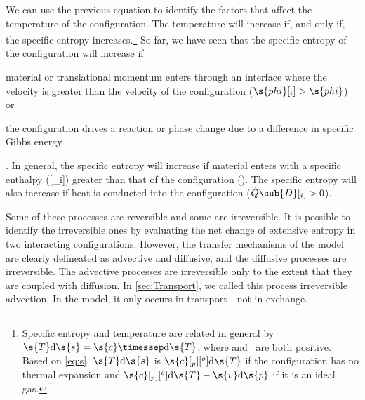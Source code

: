 We can use the previous equation to identify the factors that affect the temperature of the configuration.  The temperature will increase if, and only if, the specific entropy increases.\footnote{Specific entropy and temperature are related in general by $\s{T}\mathrm{d}\s{s} = \s{c}\timessep\mathrm{d}\s{T}$, where  and~ are both positive.  Based on \autoref{eq:s}, $\s{T}\mathrm{d}\s{s}$ is $\s{c}[_p][^o]\mathrm{d}\s{T}$ if the configuration has no thermal expansion and $\s{c}[_p][^o]\mathrm{d}\s{T} - \s{v}\mathrm{d}\s{p}$ if it is an ideal gas.}  So far, we have seen that the specific entropy of the configuration will increase if \begin{inparaenum}[(1)]\item material or translational momentum enters through an interface where the velocity is greater than the velocity of the configuration ($\s{phi}[_i] > \s{phi}$) or \item the configuration drives a reaction or phase change due to a difference in specific Gibbs energy\end{inparaenum}.  In general, the specific entropy will increase if material enters with a specific enthalpy ([_i]) greater than that of the configuration ().  The specific entropy will also increase if heat is conducted into the configuration ($\dot{Q}\sub{D}[_i] > 0$).

Some of these processes are reversible and some are irreversible.  It is possible to identify the irreversible ones by evaluating the net change of extensive entropy in two interacting configurations.  However, the transfer mechanisms of the model are clearly delineated as advective and diffusive, and the diffusive processes are irreversible.  The advective processes are irreversible only to the extent that they are coupled with diffusion.  In \autoref{sec:Transport}, we called this process irreversible advection.  In the model, it only occurs in transport---not in exchange.


